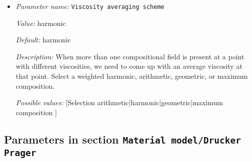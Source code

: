\begin{itemize}
{\it Possible values:} [List list of <[Double 0...1.79769e+308 (inclusive)]> of length 0...4294967295 (inclusive)]
\item {\it Parameter name:} {\tt Viscosity averaging scheme}
\label{parameters:Material model/DiffusionDislocation/Viscosity averaging scheme}


{\it Value:} harmonic


{\it Default:} harmonic


{\it Description:} When more than one compositional field is present at a point with different viscosities, we need to come up with an average viscosity at that point.  Select a weighted harmonic, arithmetic, geometric, or maximum composition.


{\it Possible values:} [Selection arithmetic|harmonic|geometric|maximum composition ]
\end{itemize}

\subsection{Parameters in section \tt Material model/Drucker Prager}
\label{parameters:Material_20model/Drucker_20Prager}


